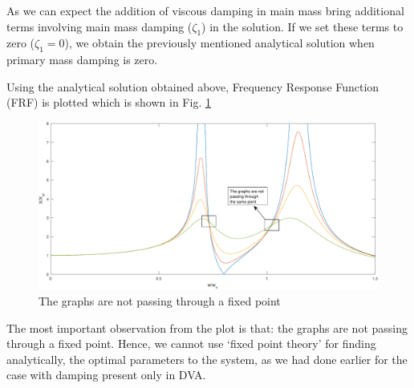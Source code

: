As we can expect the addition of viscous damping in main mass bring additional terms involving main mass damping ($\zeta_1$) in the solution. If we set these terms to zero ($\zeta_1 = 0$), we obtain the previously mentioned analytical solution when primary mass damping is zero.

Using the analytical solution obtained above, Frequency Response Function (FRF) is plotted which is shown in Fig. \ref{point}
\begin{figure}[h]
\centering
\includegraphics[scale=0.55]{"figures/point"}
\caption{The graphs are not passing through a fixed
\label{point}
 point}
\end{figure}
\par
The most important observation from the plot is that: the 
graphs are not passing through a fixed point. Hence, we cannot use `fixed point theory' for finding analytically, the optimal parameters to the system, as we had done earlier for the case with damping present only in DVA.

